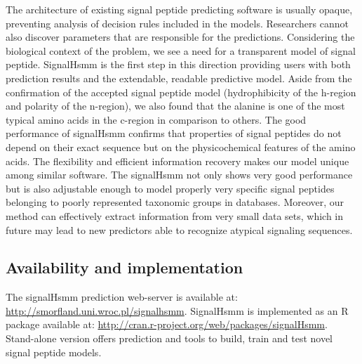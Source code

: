 \documentclass[fleqn,10pt,twoside]{gcb15submission}
\begin{document}
The architecture of existing signal peptide predicting software is usually opaque, preventing analysis of decision rules included in the models. Researchers cannot also discover  parameters that are responsible for the predictions. Considering the biological context of the problem, we see a need for a transparent model of signal peptide. SignalHsmm is the first step in this direction providing users with both prediction results and the extendable, readable predictive model. 
Aside from the confirmation of the accepted signal peptide model (hydrophibicity of the h-region and polarity of the n-region), we also found that the alanine is one of the most typical amino acids in the c-region in comparison to others.
The good performance of signalHsmm confirms that properties of signal peptides do not depend on their exact sequence but on the physicochemical features of the amino acids. 
The flexibility and efficient information recovery makes our model unique among similar software. The signalHsmm not only shows very good performance but is also adjustable enough to model properly very specific signal peptides belonging to poorly represented taxonomic groups in databases. Moreover, our method can effectively extract information from very small data sets, which in future may lead to new predictors able to recognize atypical signaling sequences.

\subsection*{Availability and implementation}
The signalHsmm prediction web-server is available at: \url{http://smorfland.uni.wroc.pl/signalhsmm}. SignalHsmm is implemented as an R package available at: \url{http://cran.r-project.org/web/packages/signalHsmm}. Stand-alone version offers prediction and tools to build, train and test novel signal peptide models.



\end{document}
